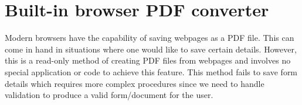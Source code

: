 \documentclass[paper.tex]{subfiles}
\begin{document}
\section{Built-in browser PDF converter}
\par
Modern browsers have the capability of saving webpages as a PDF file. This can come in hand in situations where one would like to save certain details. However, this is a read-only method of creating PDF files from webpages and involves no special application or code to achieve this feature. This method fails to save form details which requires more complex procedures since we need to handle validation to produce a valid form/document for the user.
\end{document}

